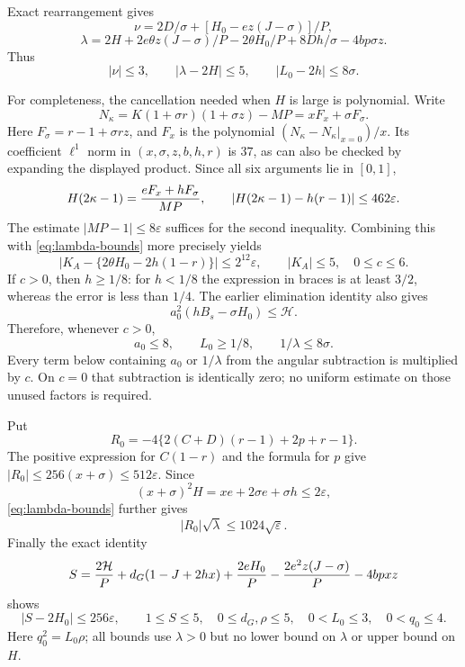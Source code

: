 \documentclass[11pt]{article}
\newcommand{\eps}{\varepsilon}
\begin{document}
Exact rearrangement gives
\[
 \nu=2D/\sigma+[H_0-ez(J-\sigma)]/P,
\]
\[
 \lambda=2H+2e\theta z(J-\sigma)/P
                  -2\theta H_0/P+8Dh/\sigma-4bp\sigma z.
\]
Thus
\begin{equation}\label{eq:lambda-bounds}
 |\nu|\le3,\qquad |\lambda-2H|\le5,
 \qquad |L_0-2h|\le8\sigma.
\end{equation}

For completeness, the cancellation needed when $H$ is large is
polynomial. Write
\[
 N_\kappa=K(1+\sigma r)(1+\sigma z)-MP=xF_x+\sigma F_\sigma.
\]
Here $F_\sigma=r-1+\sigma rz$, and $F_x$ is the polynomial
$(N_\kappa-N_\kappa|_{x=0})/x$. Its coefficient $\ell^1$ norm
in $(x,\sigma,z,b,h,r)$ is $37$, as can also be checked by
expanding the displayed product. Since all six arguments lie in
$[0,1]$,
\[
 H(2\kappa-1)={eF_x+hF_\sigma\over MP},\qquad
 |H(2\kappa-1)-h(r-1)|\le462\eps.
\]
The estimate $|MP-1|\le8\eps$ suffices for the second inequality.
Combining this with \eqref{eq:lambda-bounds} more precisely yields
\begin{equation}\label{eq:KA-bounds}
 |K_A-\{2\theta H_0-2h(1-r)\}|\le2^{12}\eps,
 \qquad |K_A|\le5,\quad 0\le c\le6.
\end{equation}
If $c>0$, then $h\ge1/8$: for $h<1/8$ the expression in braces
is at least $3/2$, whereas the error is less than $1/4$.
The earlier elimination identity also gives
\[
 a_0^2(hB_s-\sigma H_0)\le\mathcal H.
\]
Therefore, whenever $c>0$,
\begin{equation}\label{eq:c-positive}
 a_0\le8,\qquad L_0\ge1/8,\qquad
 1/\lambda\le8\sigma.
\end{equation}
Every term below containing $a_0$ or $1/\lambda$ from the angular
subtraction is multiplied by $c$. On $c=0$ that subtraction is
identically zero; no uniform estimate on those unused factors is
required.

Put
\[
 R_0=-4\{2(C+D)(r-1)+2p+r-1\}.
\]
The positive expression for $C(1-r)$ and the formula for $p$ give
$|R_0|\le256(x+\sigma)\le512\eps$. Since
\[
 (x+\sigma)^2H=xe+2\sigma e+\sigma h\le2\eps,
\]
\eqref{eq:lambda-bounds} further gives
\begin{equation}\label{eq:R0-bounds}
 |R_0|\sqrt\lambda\le1024\sqrt\eps.
\end{equation}
Finally the exact identity
\[
 S={2\mathcal H\over P}+d_G(1-J+2hx)
       +{2eH_0\over P}-{2e^2z(J-\sigma)\over P}-4bpxz
\]
shows
\begin{equation}\label{eq:S-bounds}
 |S-2H_0|\le256\eps,\qquad
 1\le S\le5,\quad 0\le d_G,\rho\le5,
 \quad 0<L_0\le3,\quad 0<q_0\le4.
\end{equation}
Here $q_0^2=L_0\rho$; all bounds use $\lambda>0$ but no lower
bound on $\lambda$ or upper bound on $H$.
\end{document}
